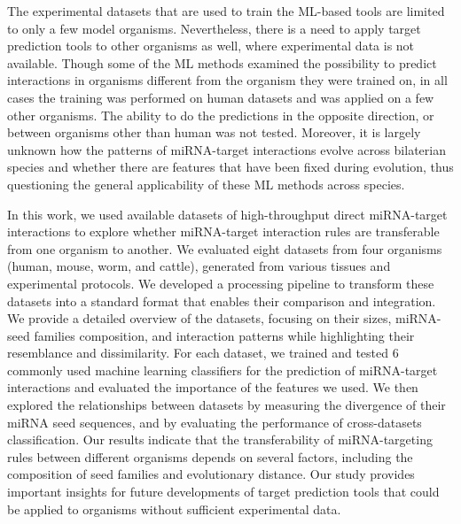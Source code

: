 The experimental datasets that are used to train the ML-based tools are limited to only a few model organisms. Nevertheless, there is a need to apply target prediction tools to other organisms as well, where experimental data is not available. Though some of the ML methods examined the possibility to predict interactions in organisms different from the organism they were trained on, in all cases the training was performed on human datasets and was applied on a few other organisms. The ability to do the predictions in the opposite direction, or between organisms other than human was not tested. Moreover, it is largely unknown how the patterns of miRNA-target interactions evolve across bilaterian species and whether there are features that have been fixed during evolution, thus questioning the general applicability of these ML methods across species.  

In this work, we used available datasets of high-throughput direct miRNA-target interactions to explore whether miRNA-target interaction rules are transferable from one organism to another. We evaluated eight datasets from four organisms (human, mouse, worm, and cattle), generated from various tissues and experimental protocols. We developed a processing pipeline to transform these datasets into a standard format that enables their comparison and integration. We provide a detailed overview of the datasets, focusing on their sizes, miRNA-seed families composition, and interaction patterns while highlighting their resemblance and dissimilarity. For each dataset, we trained and tested 6 commonly used machine learning classifiers for the prediction of miRNA-target interactions and evaluated the importance of the features we used.
We then explored the relationships between datasets by measuring the divergence of their miRNA seed sequences, and by evaluating the performance of cross-datasets classification. Our results indicate that the transferability of miRNA-targeting rules between different organisms depends on several factors, including the composition of seed families and evolutionary distance. Our study provides important insights for future developments of target prediction tools that could be applied to organisms without sufficient experimental data.